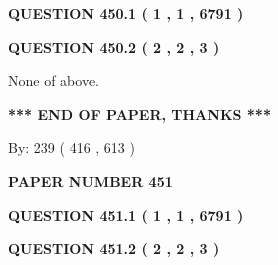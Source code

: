 \documentclass[12pt]{article}
\begin{document}
   
  
\vspace{0.2in}
  
{\textbf{\Large{QUESTION
450.1 
 ( 1 , 1 , 6791 )
}}}
  
  
  
\vspace{0.2in}
  
{\textbf{\Large{QUESTION
450.2 
 ( 2 , 2 , 3 )
}}}
  
  
 
 
\noindent{}
 
 
 None of above.
 
 
 
 
   
   
 \vspace{0.2in}
 
   
   
   
   
\vspace{1.0in} 
{\textbf{\large{ *** END OF PAPER, THANKS *** }}} 
   
   
\hspace{1.0in} By: 
 239 ( 416 ,  613 )
   
   
   
   
\newpage 
\setcounter{page}{ 
   451001 } 
   
   
   
   
 {\textbf{ \Large{ PAPER NUMBER  451  }}}
   
   
\vspace{0.2in}
   
   
   
   
   
   
 \vspace{0.2in}
 
 
 
 
   
   
  
\vspace{0.2in}
  
{\textbf{\Large{QUESTION
451.1 
 ( 1 , 1 , 6791 )
}}}
  
  
  
\vspace{0.2in}
  
{\textbf{\Large{QUESTION
451.2 
 ( 2 , 2 , 3 )
}}}
  
\end{document}
